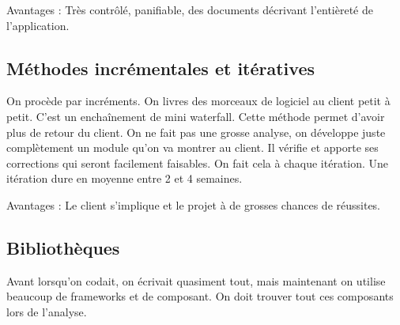 Avantages : Très contrôlé, panifiable, des documents décrivant l’entièreté de l’application.



\subsection{Méthodes incrémentales et itératives}
On procède par incréments. On livres des morceaux de logiciel au client petit à petit. C’est un enchaînement de mini waterfall. Cette méthode permet d’avoir plus de retour du client. On ne fait pas une grosse analyse, on développe juste complètement un module qu’on va montrer au client. Il vérifie et apporte ses corrections qui seront facilement faisables. On fait cela à chaque itération. Une itération dure en moyenne entre 2 et 4 semaines.

Avantages : Le client s’implique et le projet à de grosses chances de réussites.



\subsection{Bibliothèques}
Avant lorsqu’on codait, on écrivait quasiment tout, mais maintenant on utilise beaucoup de frameworks et de composant. On doit trouver tout ces composants lors de l’analyse.
